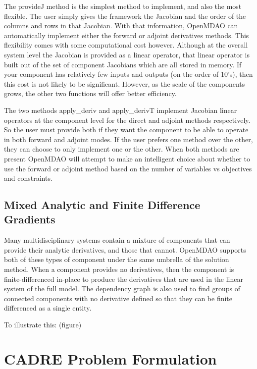 \documentclass[]{aiaa-tc} %
\begin{document}
    The provideJ method is the simplest method to implement, and also the most flexible. The user simply gives the framework the 
    Jacobian and the order of the columns and rows in that Jacobian. With that information, OpenMDAO can automatically 
    implement either the forward or adjoint derivatives methods. This flexibility comes with some computational cost however. 
    Although at the overall system level the Jacobian is provided as a linear operator, that linear operator is built out 
    of the set of component Jacobians which are all stored in memory. If your component has relatively few inputs and outputs 
    (on the order of 10's), then this cost is not likely to be significant. However, as the scale of the components grows, 
    the other two functions will offer better efficiency. 

    The two methods apply_deriv and apply_derivT implement Jacobian linear operators at 
    the component level for the direct and adjoint methods respectively. So the user must provide both if they 
    want the component to be able to operate in both forward and adjoint modes. If the user prefers one method over 
    the other, they can choose to only implement one or the other. When both methods are present OpenMDAO will 
    attempt to make an intelligent choice about whether to use the forward or adjoint method based on the number 
    of variables vs objectives and constraints. 
    
    \subsection{Mixed Analytic and Finite Difference Gradients}
    
    Many multidisciplinary systems contain a mixture of components that can provide their analytic derivatives, and
    those that cannot. OpenMDAO supports both of these types of component under the same umbrella of the
    solution method. When a component provides no derivatives, then the component is finite-differenced in-place to
    produce the derivatives that are used in the linear system of the full model. The dependency graph is also used
    to find groups of connected components with no derivative defined so that they can be finite differenced as a single entity. 
    
    To illustrate this: (figure)
    
  \section{CADRE Problem Formulation}
\end{document}
